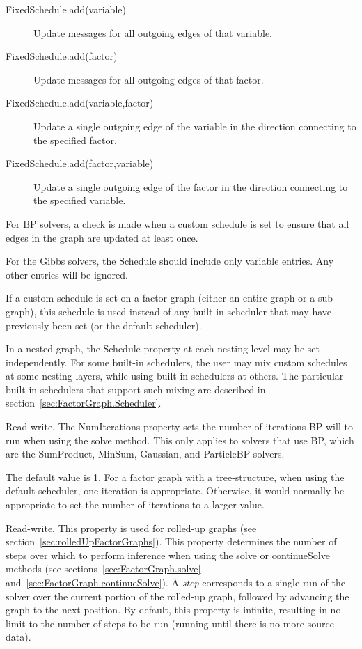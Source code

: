 \ifjava
\begin{description}
\item[FixedSchedule.add(variable)] Update messages for all outgoing edges of that variable.
\item[FixedSchedule.add(factor)] Update messages for all outgoing edges of that factor.
\item[FixedSchedule.add(variable,factor)] Update a single outgoing edge of the variable in the direction connecting to the specified factor.
\item[FixedSchedule.add(factor,variable)] Update a single outgoing edge of the factor in the direction connecting to the specified variable.
\end{description}
\fi

For BP solvers, a check is made when a custom schedule is set to ensure that all edges in the graph are updated at least once.

For the Gibbs solvers, the Schedule should include only variable entries.  Any other entries will be ignored.

If a custom schedule is set on a factor graph (either an entire graph or a sub-graph), this schedule is used instead of any built-in scheduler that may have previously been set (or the default scheduler).

In a nested graph, the Schedule property at each nesting level may be set independently.  For some built-in schedulers, the user may mix custom schedules at some nesting layers, while using built-in schedulers at others.  The particular built-in schedulers that support such mixing are described in section~\ref{sec:FactorGraph.Scheduler}.



Read-write.  The NumIterations property sets the number of iterations BP will to run when using the solve method.  This only applies to solvers that use BP, which are the SumProduct, MinSum, Gaussian, and ParticleBP solvers.

The default value is 1.  For a factor graph with a tree-structure, when using the default scheduler, one iteration is appropriate.  Otherwise, it would normally be appropriate to set the number of iterations to a larger value.


Read-write.  This property is used for rolled-up graphs (see section~\ref{sec:rolledUpFactorGraphs}).  This property determines the number of steps over which to perform inference when using the solve or continueSolve methods (see sections~\ref{sec:FactorGraph.solve} and~\ref{sec:FactorGraph.continueSolve}).  A \emph{step} corresponds to a single run of the solver over the current portion of the rolled-up graph, followed by advancing the graph to the next position.  By default, this property is infinite, resulting in no limit to the number of steps to be run (running until there is no more source data).


